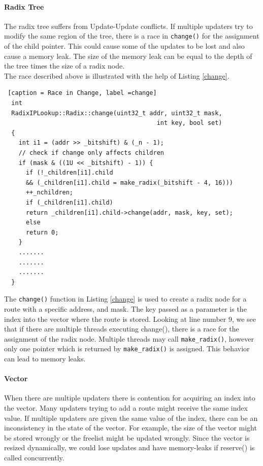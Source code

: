 \documentclass[12pt,a4paper]{article}
\begin{document}
\paragraph{Radix Tree}
The radix tree suffers from Update-Update conflicts. If multiple updaters try to modify the same region of the tree, there is a race in \verb+change()+ for the assignment of the child pointer. This could cause some of the updates to be lost and also cause a memory leak. The size of the memory leak can be equal to the depth of the tree times the size of a radix node.\\

The race described above is illustrated with the help of Listing \ref{change}.
\begin{lstlisting} [caption = Race in Change, label =change]
  int
  RadixIPLookup::Radix::change(uint32_t addr, uint32_t mask,
                                          int key, bool set)
  {
    int i1 = (addr >> _bitshift) & (_n - 1);
    // check if change only affects children
    if (mask & ((1U << _bitshift) - 1)) {
      if (!_children[i1].child
      && (_children[i1].child = make_radix(_bitshift - 4, 16)))
      ++_nchildren;
      if (_children[i1].child)
      return _children[i1].child->change(addr, mask, key, set);
      else
      return 0;
    }
    .......
    .......
    .......
  }
\end{lstlisting}
The \verb+change()+ function in Listing \ref{change} is used to create a radix node for a route with a specific address, and mask. The key passed as a parameter is the index into the vector where the route is stored. Looking at line number 9, we see that if there are multiple threads executing change(), there is a race for the assignment of the radix node. Multiple threads may call \verb+make_radix()+, however only one pointer which is returned by \verb+make_radix()+ is assigned. This behavior can lead to memory leaks.
\paragraph{Vector}
When there are multiple updaters there is contention for acquiring an index into the vector. Many updaters trying to add a route might receive the same index value. If multiple updaters are given the same value of the index, there can be an inconsistency in the state of the vector. For example, the size of the vector might be stored wrongly or the freelist might be updated wrongly. Since the vector is resized dynamically, we could lose updates and have memory-leaks if reserve() is called concurrently.\\
\end{document}
